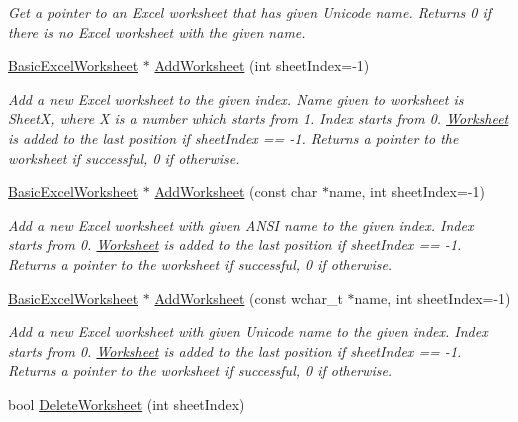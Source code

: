 \begin{DoxyCompactItemize}
\begin{DoxyCompactList}\small\item\em Get a pointer to an Excel worksheet that has given Unicode name. Returns 0 if there is no Excel worksheet with the given name. \end{DoxyCompactList}\item 
\hyperlink{class_y_excel_1_1_basic_excel_worksheet}{Basic\+Excel\+Worksheet} $\ast$ \hyperlink{class_y_excel_1_1_basic_excel_a9c4ae9337b3cb20640cd684efc31f733}{Add\+Worksheet} (int sheet\+Index=-\/1)
\begin{DoxyCompactList}\small\item\em Add a new Excel worksheet to the given index. Name given to worksheet is Sheet\+X, where X is a number which starts from 1. Index starts from 0. \hyperlink{class_y_excel_1_1_worksheet}{Worksheet} is added to the last position if sheet\+Index == -\/1. Returns a pointer to the worksheet if successful, 0 if otherwise. \end{DoxyCompactList}\item 
\hyperlink{class_y_excel_1_1_basic_excel_worksheet}{Basic\+Excel\+Worksheet} $\ast$ \hyperlink{class_y_excel_1_1_basic_excel_a7562ed13b097e1fab5b7950154b49df6}{Add\+Worksheet} (const char $\ast$name, int sheet\+Index=-\/1)
\begin{DoxyCompactList}\small\item\em Add a new Excel worksheet with given A\+N\+S\+I name to the given index. Index starts from 0. \hyperlink{class_y_excel_1_1_worksheet}{Worksheet} is added to the last position if sheet\+Index == -\/1. Returns a pointer to the worksheet if successful, 0 if otherwise. \end{DoxyCompactList}\item 
\hyperlink{class_y_excel_1_1_basic_excel_worksheet}{Basic\+Excel\+Worksheet} $\ast$ \hyperlink{class_y_excel_1_1_basic_excel_aaf2cba719b36e658d2273ea8888dd2c9}{Add\+Worksheet} (const wchar\+\_\+t $\ast$name, int sheet\+Index=-\/1)
\begin{DoxyCompactList}\small\item\em Add a new Excel worksheet with given Unicode name to the given index. Index starts from 0. \hyperlink{class_y_excel_1_1_worksheet}{Worksheet} is added to the last position if sheet\+Index == -\/1. Returns a pointer to the worksheet if successful, 0 if otherwise. \end{DoxyCompactList}\item 
bool \hyperlink{class_y_excel_1_1_basic_excel_af5113897cf4c4326e1ad14e38f745ec1}{Delete\+Worksheet} (int sheet\+Index)

\end{DoxyCompactItemize}
